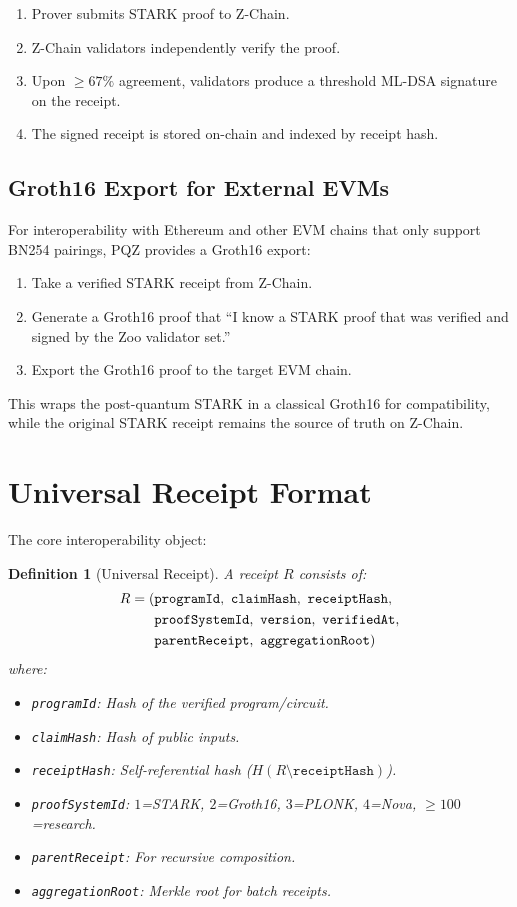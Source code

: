 \documentclass[11pt,a4paper]{article}
\newtheorem{definition}{Definition}
\begin{document}
\begin{enumerate}
\item Prover submits STARK proof to Z-Chain.
\item Z-Chain validators independently verify the proof.
\item Upon $\geq 67\%$ agreement, validators produce a threshold ML-DSA signature on the receipt.
\item The signed receipt is stored on-chain and indexed by receipt hash.
\end{enumerate}

\subsection{Groth16 Export for External EVMs}

For interoperability with Ethereum and other EVM chains that only support BN254 pairings, PQZ provides a Groth16 export:

\begin{enumerate}
\item Take a verified STARK receipt from Z-Chain.
\item Generate a Groth16 proof that ``I know a STARK proof that was verified and signed by the Zoo validator set.''
\item Export the Groth16 proof to the target EVM chain.
\end{enumerate}

This wraps the post-quantum STARK in a classical Groth16 for compatibility, while the original STARK receipt remains the source of truth on Z-Chain.

\section{Universal Receipt Format}

The core interoperability object:

\begin{definition}[Universal Receipt]
A receipt $R$ consists of:
\begin{align}
R = (&\texttt{programId},\ \texttt{claimHash},\ \texttt{receiptHash}, \notag \\
     &\texttt{proofSystemId},\ \texttt{version},\ \texttt{verifiedAt}, \notag \\
     &\texttt{parentReceipt},\ \texttt{aggregationRoot}) \notag
\end{align}
where:
\begin{itemize}
\item \texttt{programId}: Hash of the verified program/circuit.
\item \texttt{claimHash}: Hash of public inputs.
\item \texttt{receiptHash}: Self-referential hash ($H(R \setminus \texttt{receiptHash})$).
\item \texttt{proofSystemId}: $1$=STARK, $2$=Groth16, $3$=PLONK, $4$=Nova, $\geq 100$=research.
\item \texttt{parentReceipt}: For recursive composition.
\item \texttt{aggregationRoot}: Merkle root for batch receipts.
\end{itemize}
\end{definition}
\end{document}
